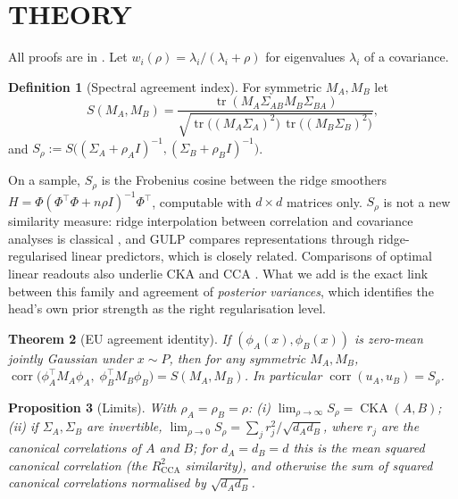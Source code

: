 \documentclass[twoside]{article}
\newtheorem{theorem}{Theorem}
\newtheorem{proposition}[theorem]{Proposition}
\theoremstyle{definition}
\newtheorem{definition}[theorem]{Definition}
\theoremstyle{remark}
\newcommand{\tr}{\operatorname{tr}}
\newcommand{\corr}{\operatorname{corr}}
\newcommand{\cka}{\operatorname{CKA}}
\newcommand{\Srho}{S_{\rho}}
\begin{document}
\section{THEORY}
\label{sec:theory}

All proofs are in . Let $w_i(\rho)=\lambda_i/(\lambda_i+\rho)$ for eigenvalues $\lambda_i$ of a covariance.

\begin{definition}[Spectral agreement index]
For symmetric $M_A,M_B$ let
\[
S(M_A,M_B)=\frac{\tr(M_A\Sigma_{AB}M_B\Sigma_{BA})}{\sqrt{\tr\big((M_A\Sigma_A)^2\big)\,\tr\big((M_B\Sigma_B)^2\big)}},
\]
and $\Srho:=S\big((\Sigma_A+\rho_A I)^{-1},(\Sigma_B+\rho_B I)^{-1}\big)$.
\end{definition}
On a sample, $\Srho$ is the Frobenius cosine between the ridge smoothers $H=\Phi(\Phi^\top\Phi+n\rho I)^{-1}\Phi^\top$, computable with $d\times d$ matrices only.
$\Srho$ is not a new similarity measure: ridge interpolation between correlation and covariance analyses is classical \citep{vinod1976canonical,bach2002kernelica}, and GULP \citep{boixadsera2022gulp} compares representations through ridge-regularised linear predictors, which is closely related. Comparisons of optimal linear readouts also underlie CKA and CCA \citep{harvey2024decodable}. What we add is the exact link between this family and agreement of \emph{posterior variances}, which identifies the head's own prior strength as the right regularisation level.

\begin{theorem}[EU agreement identity]
\label{thm:identity}
If $(\phi_A(x),\phi_B(x))$ is zero-mean jointly Gaussian under $x\sim P$, then for any symmetric $M_A,M_B$,
$\corr\big(\phi_A^\top M_A\phi_A,\;\phi_B^\top M_B\phi_B\big)=S(M_A,M_B)$.
In particular $\corr(u_A,u_B)=\Srho$.
\end{theorem}

\begin{proposition}[Limits]
\label{prop:limits}
With $\rho_A=\rho_B=\rho$: (i) $\lim_{\rho\to\infty}\Srho=\cka(A,B)$; (ii) if $\Sigma_A,\Sigma_B$ are invertible, $\lim_{\rho\to 0}\Srho=\sum_j r_j^2/\sqrt{d_Ad_B}$, where $r_j$ are the canonical correlations of $A$ and $B$; for $d_A=d_B=d$ this is the mean squared canonical correlation (the $R^2_{\mathrm{CCA}}$ similarity), and otherwise the sum of squared canonical correlations normalised by $\sqrt{d_Ad_B}$.
\end{proposition}
\end{document}
